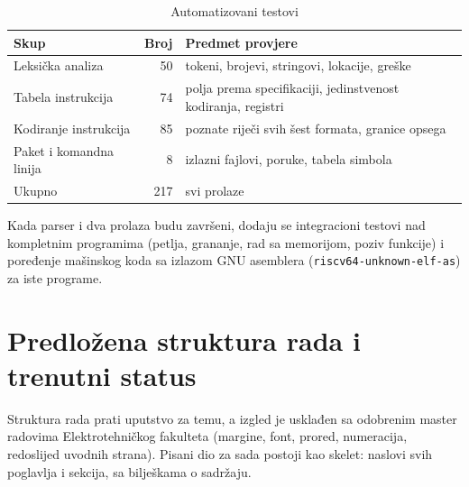 \documentclass[11pt,a4paper]{article}
\newcommand{\kod}[1]{\texttt{#1}}
\begin{document}
\begin{table}[h]
  \centering
  \caption{Automatizovani testovi}
  \begin{tabularx}{0.85\textwidth}{@{}lrY@{}}
    \toprule
    \textbf{Skup} & \textbf{Broj} & \textbf{Predmet provjere} \\
    \midrule
    Leksička analiza            & 50  & tokeni, brojevi, stringovi, lokacije, greške \\
    Tabela instrukcija          & 74  & polja prema specifikaciji, jedinstvenost kodiranja, registri \\
    Kodiranje instrukcija       & 85  & poznate riječi svih šest formata, granice opsega \\
    Paket i komandna linija     & 8   & izlazni fajlovi, poruke, tabela simbola \\
    \midrule
    Ukupno                      & 217 & svi prolaze \\
    \bottomrule
  \end{tabularx}
\end{table}

Kada parser i dva prolaza budu završeni, dodaju se integracioni testovi nad kompletnim
programima (petlja, grananje, rad sa memorijom, poziv funkcije) i poređenje mašinskog koda sa
izlazom GNU asemblera (\kod{riscv64-unknown-elf-as}) za iste programe.

\section{Predložena struktura rada i trenutni status}

Struktura rada prati uputstvo za temu, a izgled je usklađen sa odobrenim master radovima
Elektrotehničkog fakulteta (margine, font, prored, numeracija, redoslijed uvodnih strana).
Pisani dio za sada postoji kao skelet: naslovi svih poglavlja i sekcija, sa bilješkama o sadržaju.
\end{document}
